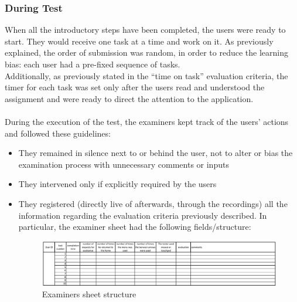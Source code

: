\documentclass[11pt, letterpaper]{article}
\begin{document}
\subsubsection{During Test}
When all the introductory steps have been completed, the users were ready to start. They would receive one task at a time and work on it. As previously explained, the order of submission was random, in order to reduce the learning bias: each user had a pre-fixed sequence of tasks. \\
Additionally, as previously stated in the “time on task” evaluation criteria, the timer for each task was set only after the users read and understood the assignment and were ready to direct the attention to the application. \\
\\
During the execution of the test, the examiners kept track of the users’ actions and followed these guidelines: 
\begin{itemize}
    \item They remained in silence next to or behind the user, not to alter or bias the examination process with unnecessary comments or inputs 
    \item They intervened only if explicitly required by the users 
    \item They registered (directly live of afterwards, through the recordings) all the information regarding the evaluation criteria previously described. In particular, the examiner sheet had the following fields/structure: 
    
    \begin{figure}[H]
        \centering
        \includegraphics[width=18cm]{images/user testing/Sample_sheet.png}
        \caption{Examiners sheet structure}
        \label{fig:my_label}
    \end{figure}
\end{itemize}
\end{document}
